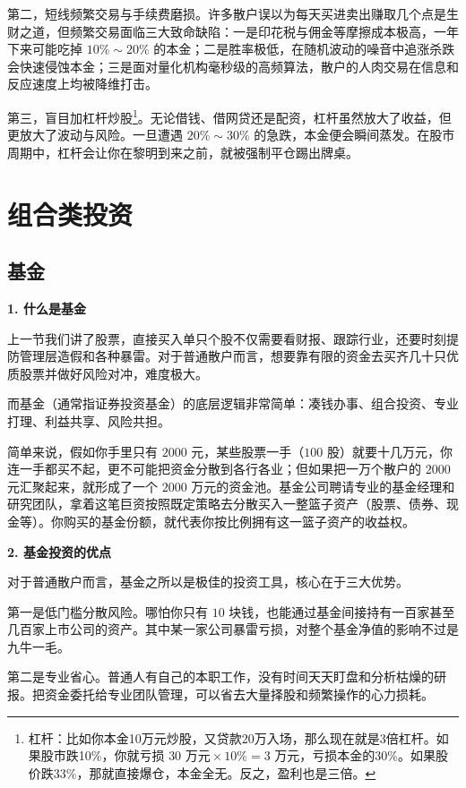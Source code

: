 \documentclass[12pt,openany]{book}
\newcommand{\subhead}[1]{%
    \par\vspace{0.5\baselineskip}%
    \noindent\textbf{#1}\par%
    \vspace{0.5\baselineskip}%
}
\begin{document}
第二，短线频繁交易与手续费磨损。许多散户误以为每天买进卖出赚取几个点是生财之道，但频繁交易面临三大致命缺陷：一是印花税与佣金等摩擦成本极高，一年下来可能吃掉 $10\%\sim 20\%$ 的本金；二是胜率极低，在随机波动的噪音中追涨杀跌会快速侵蚀本金；三是面对量化机构毫秒级的高频算法，散户的人肉交易在信息和反应速度上均被降维打击。

第三，盲目加杠杆炒股\footnote{杠杆：比如你本金10万元炒股，又贷款20万入场，那么现在就是3倍杠杆。如果股市跌10\%，你就亏损 $30\text{ 万元} \times 10\% = 3\text{ 万元}$，亏损本金的$30\%$。如果股价跌33\%，那就直接爆仓，本金全无。反之，盈利也是三倍。}。无论借钱、借网贷还是配资，杠杆虽然放大了收益，但更放大了波动与风险。一旦遭遇 $20\%\sim 30\%$ 的急跌，本金便会瞬间蒸发。在股市周期中，杠杆会让你在黎明到来之前，就被强制平仓踢出牌桌。

\section{组合类投资}

\subsection{基金}

\subhead{1. 什么是基金}

上一节我们讲了股票，直接买入单只个股不仅需要看财报、跟踪行业，还要时刻提防管理层造假和各种暴雷。对于普通散户而言，想要靠有限的资金去买齐几十只优质股票并做好风险对冲，难度极大。

而基金（通常指证券投资基金）的底层逻辑非常简单：凑钱办事、组合投资、专业打理、利益共享、风险共担。

简单来说，假如你手里只有 $2000$ 元，某些股票一手（$100$ 股）就要十几万元，你连一手都买不起，更不可能把资金分散到各行各业；但如果把一万个散户的 $2000$ 元汇聚起来，就形成了一个 $2000$ 万元的资金池。基金公司聘请专业的基金经理和研究团队，拿着这笔巨资按照既定策略去分散买入一整篮子资产（股票、债券、现金等）。你购买的基金份额，就代表你按比例拥有这一篮子资产的收益权。

\subhead{2. 基金投资的优点}

对于普通散户而言，基金之所以是极佳的投资工具，核心在于三大优势。

第一是低门槛分散风险。哪怕你只有 $10$ 块钱，也能通过基金间接持有一百家甚至几百家上市公司的资产。其中某一家公司暴雷亏损，对整个基金净值的影响不过是九牛一毛。

第二是专业省心。普通人有自己的本职工作，没有时间天天盯盘和分析枯燥的研报。把资金委托给专业团队管理，可以省去大量择股和频繁操作的心力损耗。
\end{document}
